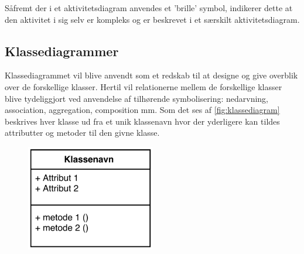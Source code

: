 Såfremt der i et aktivitetsdiagram anvendes et 'brille' symbol, indikerer dette at den aktivitet i sig selv er kompleks og er beskrevet i et særskilt aktivitetsdiagram.  

\subsection{Klassediagrammer}
Klassediagrammet vil blive anvendt som et redskab til at designe og give overblik over de forskellige klasser. Hertil vil relationerne mellem de forskellige klasser blive tydeliggjort ved anvendelse af tilhørende symbolisering: nedarvning, association, aggregation, composition mm. Som det ses af \autoref{fig:klassediagram} beskrives hver klasse ud fra et unik klassenavn hvor der yderligere kan tildes attributter og metoder til den givne klasse.  

\begin{figure} [H]
\centering
\includegraphics[width=0.5\textwidth]{figures/klassediag}
\caption{}
\label{fig:klassediagram}
\end{figure}